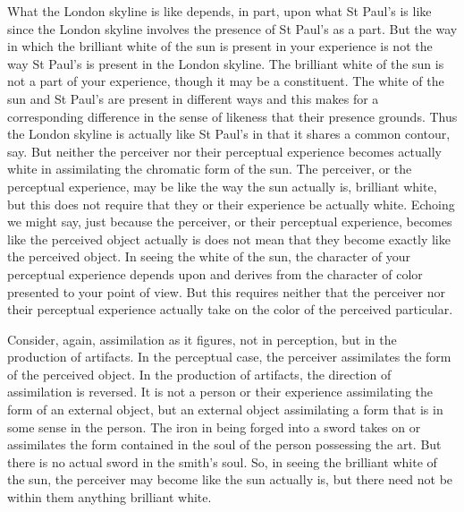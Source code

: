 What the London skyline is like depends, in part, upon what St Paul's is like since the London skyline involves the presence of St Paul's as a part. But the way in which the brilliant white of the sun is present in your experience is not the way St Paul's is present in the London skyline. The brilliant white of the sun is not a part of your experience, though it may be a constituent. The white of the sun and St Paul's are present in different ways and this makes for a corresponding difference in the sense of likeness that their presence grounds. Thus the London skyline is actually like St Paul's in that it shares a common contour, say. But neither the perceiver nor their perceptual experience becomes actually white in assimilating the chromatic form of the sun. The perceiver, or the perceptual experience, may be like the way the sun actually is, brilliant white, but this does not require that they or their experience be actually white. Echoing \citet{Austin:1962lr} we might say, just because the perceiver, or their perceptual experience, becomes like the perceived object actually is does not mean that they become exactly like the perceived object. In seeing the white of the sun, the character of your perceptual experience depends upon and derives from the character of color presented to your point of view. But this requires neither that the perceiver nor their perceptual experience actually take on the color of the perceived particular.

Consider, again, assimilation as it figures, not in perception, but in the production of artifacts. In the perceptual case, the perceiver assimilates the form of the perceived object. In the production of artifacts, the direction of assimilation is reversed. It is not a person or their experience assimilating the form of an external object, but an external object assimilating a form that is in some sense in the person. The iron in being forged into a sword takes on or assimilates the form contained in the soul of the person possessing the art.  But there is no actual sword in the smith’s soul. So, in seeing the brilliant white of the sun, the perceiver may become like the sun actually is, but there need not be within them anything brilliant white.

